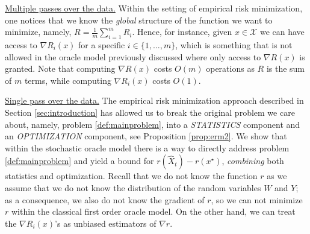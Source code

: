 \underline{Multiple passes over the data.}
Within the setting of empirical risk minimization, one notices that we know the \emph{global} structure of the function we want to minimize, namely, $R=\frac{1}{m}\sum_{i=1}^m R_i$. Hence, for instance, given $x\in\mathcal{X}$ we can have access to $\nabla R_i(x)$ for a specific $i\in\{1,\ldots,m\}$, which is something that is not allowed in the oracle model previously discussed where only access to $\nabla R(x)$ is granted. Note that computing $\nabla R(x)$ costs $O(m)$ operations as $R$ is the sum of $m$ terms, while computing $\nabla R_i(x)$ costs $O(1)$.

\underline{Single pass over the data.}
The empirical risk minimization approach described in Section \ref{sec:introduction} has allowed us to break the original problem we care about, namely, problem \eqref{def:mainproblem}, into a \emph{STATISTICS} component and an \emph{OPTIMIZATION} component, see Proposition \ref{prop:erm2}. We show that within the stochastic oracle model there is a way to directly address problem \eqref{def:mainproblem} and yield a bound for $r(\hat X_t) - r(x^\star)$, \emph{combining} both statistics and optimization.
Recall that we do not know the function $r$ as we assume that we do not know the distribution of the random variables $W$ and $Y$; as a consequence, we also do not know the gradient of $r$, so we can not minimize $r$ within the classical first order oracle model. On the other hand, we can treat the $\nabla R_i(x)$'s as unbiased estimators of $\nabla r$.

\clearpage


